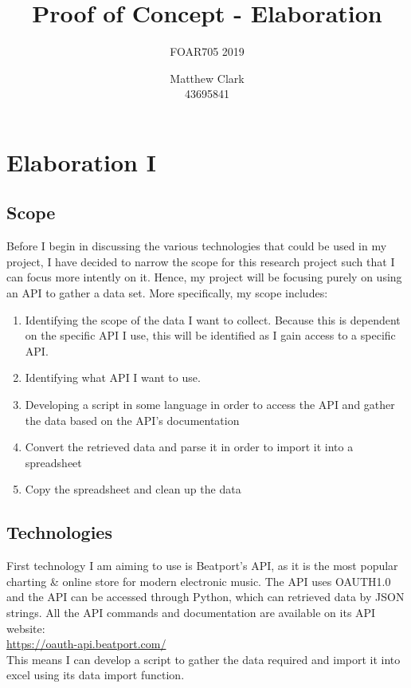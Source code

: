 \documentclass{article}
\title{Proof of Concept - Elaboration}
\subtitle{FOAR705 2019}
\author{Matthew Clark\\43695841}
\date{\vspace{-5ex}} %
\begin{document}
\doublespacing
\maketitle
\newpage
\tableofcontents
\newpage
\section{Elaboration I}
\subsection{Scope}
Before I begin in discussing the various technologies that could be used in my project, I have decided to narrow the scope for this research project such that I can focus more intently on it. Hence, my project will be focusing purely on using an API to gather a data set. More specifically, my scope includes:
\begin{enumerate}
    \item Identifying the scope of the data I want to collect. Because this is dependent on the specific API I use, this will be identified as I gain access to a specific API.
    \item Identifying what API I want to use.
    \item Developing a script in some language in order to access the API and gather the data based on the API's documentation
    \item Convert the retrieved data and parse it in order to import it into a spreadsheet
    \item Copy the spreadsheet and clean up the data
\end{enumerate}
\subsection{Technologies}
First technology I am aiming to use is Beatport's API, as it is the most popular charting \& online store for modern electronic music. The API uses OAUTH1.0 and the API can be accessed through Python, which can retrieved data by JSON strings. All the API commands and documentation are available on its API website:\\\url{https://oauth-api.beatport.com/}\\This means I can develop a script to gather the data required and import it into excel using its data import function.
\end{document}
